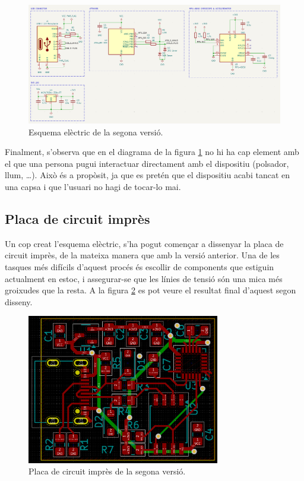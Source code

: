 \begin{figure}[ht]
    \centering
    \includegraphics[width=1\textwidth]{images/kicad/gyro2_sch.png}
    \caption{Esquema elèctric de la segona versió.}
    \label{fig:sch_v2}
\end{figure}

Finalment, s'observa que en el diagrama de la figura \ref{fig:sch_v2}
no hi ha cap element amb el que una
persona pugui interactuar directament amb el dispositiu (polsador, llum, \dots).
Això és a propòsit, ja que es pretén que el dispositiu acabi tancat en una capsa
i que l'usuari no hagi de tocar-lo mai.

\subsection{Placa de circuit imprès}

Un cop creat l'esquema elèctric, s'ha pogut començar a dissenyar la placa de
circuit imprès, de la mateixa manera que amb la versió anterior. Una de les
tasques més difícils d'aquest procés és escollir  de components
que estiguin actualment en estoc, i assegurar-se que les línies de tensió
són una mica més groixudes que la resta. A la figura \ref{fig:pcb_v2}
es pot veure el resultat
final d'aquest segon disseny.

\begin{figure}[ht]
    \centering
    \includegraphics[width=0.75\textwidth]{images/kicad/gyro2_pcb.png}
    \caption{Placa de circuit imprès de la segona versió.}
    \label{fig:pcb_v2}
\end{figure}


